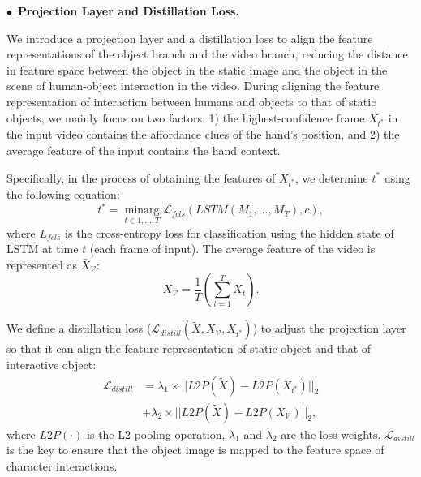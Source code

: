 \documentclass[journal,twoside]{IEEEtran}
\newcommand{\myPara}[1]{\vspace{5pt}\noindent$\bullet$~\textbf{#1} \quad}
\begin{document}
\label{projection}
\myPara{Projection Layer and Distillation Loss.}

We introduce a projection layer and a distillation loss to align the feature representations of the object branch and the video branch, reducing the distance in feature space between the object in the static image and the object in the scene of human-object interaction in the video. During aligning the feature representation of interaction between humans and objects to that of static objects, we mainly focus on two factors: 1) the highest-confidence frame $X_{t^{*}}$ in the input video contains the affordance clues of the hand's position, and 2) the average feature of the input contains the hand context. 

Specifically, in the process of obtaining the features of $X_{t^{*}}$, we determine $t^{*}$ using the following equation:
\begin{equation}
     t^{*}=\mathop{\min\arg}\limits_{t \in 1,...,T}\mathcal{L}_{fcls}(LSTM(M_{1},...,M_{T}),c),  \label{eq:no15}
\end{equation}
where $L_{fcls}$ is the cross-entropy loss for classification using the hidden state of LSTM at time $t$ (each frame of input). The average feature of the video is represented as $\bar{X}_{\mathcal{V}}$:
\begin{equation}
   X_{\mathcal{V}}=\frac{1}{T}(\sum_{t=1}^T X_{t}).  \label{eq:no16}
\end{equation}

We define a distillation loss ($\mathcal{L}_{distill}(\tilde{X},X_{\mathcal{V}}, X_{t^{*}})$) to adjust the projection layer so that it can align the feature representation of static object and that of interactive object:
\begin{equation}
\begin{split}
   \mathcal{L}_{distill}&=\lambda_{1}\times||L2P(\tilde{X})-L2P(X_{t^{*}})||_{2} \\
                                      & +\lambda_{2}\times||L2P(\tilde{X})-L2P(X_{\mathcal{V}})||_{2},  \label{eq:no17}
\end{split}
\end{equation}
where $L2P(\cdot)$ is the L2 pooling operation, $\lambda_1$ and $\lambda_2$ are the loss weights. $\mathcal{L}_{distill}$ is the key to ensure that the object image is mapped to the feature space of character interactions. 
\end{document}
